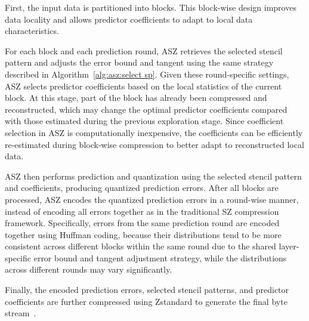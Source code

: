 First, the input data is partitioned into blocks. This block-wise design improves data locality and allows predictor coefficients to adapt to local data characteristics.

For each block and each prediction round, ASZ retrieves the selected stencil pattern and adjusts the error bound and tangent using the same strategy described in Algorithm~\ref{alg:asz:select sp}. Given these round-specific settings, ASZ selects predictor coefficients based on the local statistics of the current block. At this stage, part of the block has already been compressed and reconstructed, which may change the optimal predictor coefficients compared with those estimated during the previous exploration stage. Since coefficient selection in ASZ is computationally inexpensive, the coefficients can be efficiently re-estimated during block-wise compression to better adapt to reconstructed local data.

ASZ then performs prediction and quantization using the selected stencil pattern and coefficients, producing quantized prediction errors. After all blocks are processed, ASZ encodes the quantized prediction errors in a round-wise manner, instead of encoding all errors together as in the traditional SZ compression framework. Specifically, errors from the same prediction round are encoded together using Huffman coding, because their distributions tend to be more consistent across different blocks within the same round due to the shared layer-specific error bound and tangent adjustment strategy, while the distributions across different rounds may vary significantly.

Finally, the encoded prediction errors, selected stencil patterns, and predictor coefficients are further compressed using Zstandard to generate the final byte stream~\cite{liang2022sz3}.



